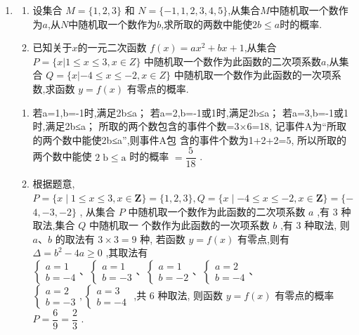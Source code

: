\begin{enumerate}
\item 
\begin{enumerate}
\item 设集合 $M=\{1,2,3\}$ 和 $N=\{-1,1,2,3,4,5\}$,从集合$M$中随机取一个数作为$a$,从$N$中随机取一个数作为$b$,求所取的两数中能使$2b\le a$时的概率.
\item 已知关于$x$的一元二次函数 $f(x)=ax^{2}+bx+1$,从集合 $P=\{x|1\le x\le3,x\in Z\}$ 中随机取一个数作为此函数的二次项系数$a$,从集合 $Q=\{x|-4\le x\le-2,x\in Z\}$ 中随机取一个数作为此函数的一次项系数,求函数 $y=f(x)$ 有零点的概率.
\end{enumerate}
\begin{jieda}
    \begin{enumerate}
        \item 若a=1,b=-1时,满足2b≤a；
若a=2,b=-1或1时,满足2b≤a；
若a=3,b=-1或1时,满足2b≤a；
所取的两个数包含的事件个数=3×6=18,
记事件A为“所取的两个数中能使2b≤a”,则事件A包
含的事件个数为1+2+2=5,
所以所取的两个数中能使 $2\mathrm{\;b} \leq  \mathrm{a}$ 时的概率 $= \dfrac{5}{18}$ . 
        \item 根据题意, $P = \{ x \mid  1 \leq  x \leq  3,x \in  \mathbf{Z}\}  = \{ 1,2,3\} ,Q = \{ x \mid   - 4 \leq  x \leq   - 2,x \in  \mathbf{Z}\}  = \{  -$
$4, - 3, - 2\}$ ,
从集合 $P$ 中随机取一个数作为此函数的二次项系数 $a$ ,有 3 种取法,集合 $Q$ 中随机取一
个数作为此函数的一次项系数 $b$ ,有 3 种取法,
则 $a\text{、}b$ 的取法有 $3 \times  3 = 9$ 种,
若函数 $y = f\left( x\right)$ 有零点,则有 $\Delta  = {b}^{2} - {4a} \geq  0$ ,其取法有 $\left\{  {\begin{array}{l} a = 1 \\  b =  - 4 \end{array}\text{、}\left\{  {\begin{array}{l} a = 1 \\  b =  - 3 \end{array}\text{、}\left\{  {\begin{array}{l} a = 1 \\  b =  - 2 \end{array}\text{、}\left\{  {\begin{array}{l} a = 2 \\  b =  - 4 \end{array}\text{、}}\right. }\right. }\right. }\right.$
$\left\{  {\begin{array}{l} a = 2 \\  b =  - 3 \end{array},\left\{  \begin{array}{l} a = 3 \\  b =  - 4 \end{array}\right. }\right.$ ,共 6 种取法,
则函数 $y = f\left( x\right)$ 有零点的概率 $P = \dfrac{6}{9} = \dfrac{2}{3}$ .
    \end{enumerate}
\end{jieda}



\end{enumerate}

